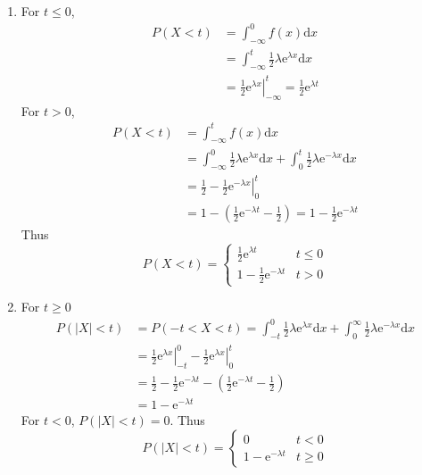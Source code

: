 \documentclass{article}
\begin{document}
\begin{enumerate}[leftmargin = 0 em, label = \arabic*., font = \bfseries]
\begin{enumerate}
\item For $t \leq 0$, 
\begin{align*}
P(X < t) & = \int_{-\infty}^0 f(x) \mathrm{d}x\\
& = \int_{-\infty}^t \frac{1}{2}\lambda \mathrm{e}^{\lambda x} \mathrm{d}x\\
& = \left.\frac{1}{2} \mathrm{e}^{\lambda x} \right|_{-\infty}^t  = \frac{1}{2} \mathrm{e}^{\lambda t}
\end{align*}
For $t > 0$,
\begin{align*}
P(X < t ) & = \int_{-\infty}^{t} f(x) \mathrm{d}x\\
& = \int_{-\infty}^0 \frac{1}{2} \lambda \mathrm{e}^{\lambda x} \mathrm{d}x + \int_{0}^{t} \frac{1}{2} \lambda \mathrm{e}^{- \lambda x} \mathrm{d}x\\
& = \frac{1}{2} -\left. \frac{1}{2} \mathrm{e}^{-\lambda x}\right|_{0}^t\\
& = 1 - \left(\frac{1}{2} \mathrm{e}^{-\lambda t} - \frac{1}{2}\right) = 1 - \frac{1}{2} \mathrm{e}^{- \lambda t}
\end{align*}
Thus
\[P(X < t) = \begin{cases}
\frac{1}{2} \mathrm{e}^{\lambda t} & t \leq 0\\
1 - \frac{1}{2} \mathrm{e}^{- \lambda t} & t > 0
\end{cases}\]

\item 
For $t \geq 0$
\begin{align*}
P(|X| < t) &= P(-t < X < t) = \int_{-t}^0 \frac{1}{2} \lambda \mathrm{e}^{\lambda x} \mathrm{d}x + \int_{0}^\infty \frac{1}{2} \lambda \mathrm{e}^{-\lambda x} \mathrm{d} x \\
&=\left.\frac{1}{2} \mathrm{e}^{\lambda x} \right|_{-t}^0 - \left.\frac{1}{2} \mathrm{e}^{\lambda x} \right|_{0}^t\\
&= \frac{1}{2} - \frac{1}{2} \mathrm{e}^{- \lambda t} - \left(\frac{1}{2} \mathrm{e}^{-\lambda t} - \frac{1}{2}\right)\\
& = 1 - \mathrm{e}^{-\lambda t}
 \end{align*}
 For $t < 0$, $P(|X| < t) = 0$. Thus
 \[P(|X| < t) = \begin{cases}
 0 & t <0\\
 1 - \mathrm{e}^{- \lambda t} & t \geq 0
 \end{cases}\]

\end{enumerate}


\end{enumerate}
\end{document}
